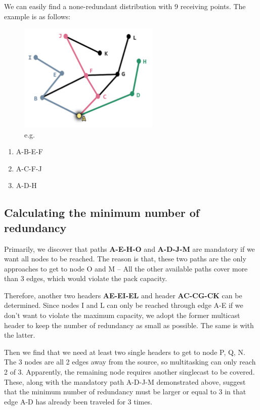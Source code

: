 \documentclass{mcmthesis}
\begin{document}
We can easily find a none-redundant distribution with 9 receiving points. The example is as follows:

\begin{figure}[H]
	\centering
	\includegraphics[width = 0.6\textwidth]{figure/fig.1-1.png} 
	\caption{e.g.}
	\label{fig:1-1}
\end{figure}

\begin{enumerate}[ \quad(1).]
\item A-B-E-F
\item A-C-F-J
\item A-D-H
\end{enumerate}

\subsection{Calculating the minimum number of redundancy}

Primarily, we discover that paths \textcolor[RGB]{180,76,151}{\bf{A-E-H-O}} and \textcolor[RGB]{230,176,112}{\bf{A-D-J-M}} are mandatory if we want all nodes to be reached. The reason is that, these two paths are the only approaches to get to node O and M -- All the other available paths cover more than 3 edges, which would violate the pack capacity. 

Therefore, another two headers \textcolor[RGB]{91,126,145}{\bf{AE-EI-EL}} and header \textcolor[RGB]{222,108,141}{\bf{AC-CG-CK}} can be determined. Since nodes I and L can only be reached through edge A-E if we don't want to violate the maximum capacity, we adopt the former multicast header to keep the number of redundancy as small as possible. The same is with the latter. 

Then we find that we need at least two single headers to get to node P, Q, N. The 3 nodes are all 2 edges away from the source, so multitasking can only reach 2 of 3. Apparently, the remaining node requires another singlecast to be covered. These, along with the mandatory path A-D-J-M demonstrated above, suggest that the minimum number of redundancy must be larger or equal to 3 in that edge A-D has already been traveled for 3 times.
\end{document}
